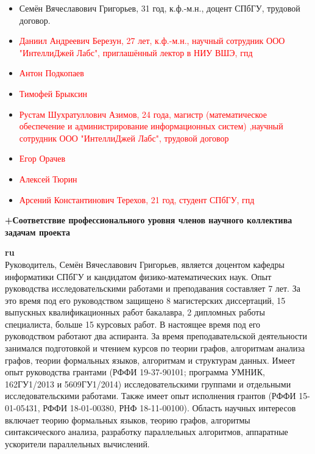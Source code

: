 \documentclass[12pt]{article}  %
\theoremstyle{remark}
\newcommand{\checkme}[1]{\textcolor{red}{#1}}
\begin{document}
\begin{itemize}
  \item Семён Вячеславович Григорьев, 31 год, к.ф.-м.н., доцент СПбГУ, трудовой договор.
  \item \checkme{Даниил Андреевич Березун, 27 лет, к.ф.-м.н., научный сотрудник ООО "ИнтеллиДжей Лабс", приглашённый лектор в НИУ ВШЭ, гпд}
  \item \checkme{Антон Подкопаев}
  \item \checkme{Тимофей	Брыксин}
  \item \checkme{Рустам Шухратуллович Азимов, 24 года, магистр (математическое обеспечение и администрирование информационных систем) ,научный сотрудник ООО "ИнтеллиДжей Лабс", трудовой договор}
  \item \checkme{Егор Орачев}
  \item \checkme{Алексей Тюрин}
  \item \checkme{Арсений Константинович Терехов, 21 год, студент СПбГУ, гпд}
\end{itemize}



\textbf{+Соответствие профессионального уровня членов научного коллектива задачам проекта}

\textbf{ru}\\
%
Руководитель, Семён Вячеславович Григорьев, является доцентом кафедры информатики СПбГУ и кандидатом физико-математических наук. Опыт руководства исследовательскими работами и преподавания составляет 7 лет. За это время под его руководством защищено 8 магистерских диссертаций, 15 выпускных квалификационных работ бакалавра, 2 дипломных работы специалиста, больше 15 курсовых работ. В настоящее время под его руководством работают два аспиранта. За время преподавательской деятельности занимался подготовкой и чтением курсов по теории графов, алгоритмам анализа графов, теории формальных языков, алгоритмам и структурам данных. Имеет опыт руководства грантами (РФФИ 19-37-90101; программа УМНИК, 162ГУ1/2013 и 5609ГУ1/2014) исследовательскими группами и отдельными исследовательскими работами. Также имеет опыт исполнения грантов (РФФИ 15-01-05431, РФФИ 18-01-00380, РНФ 18-11-00100). Область научных интересов включает теорию формальных языков, теорию графов, алгоритмы синтаксического анализа, разработку параллельных алгоритмов, аппаратные ускорители параллельных вычислений.
\end{document}
